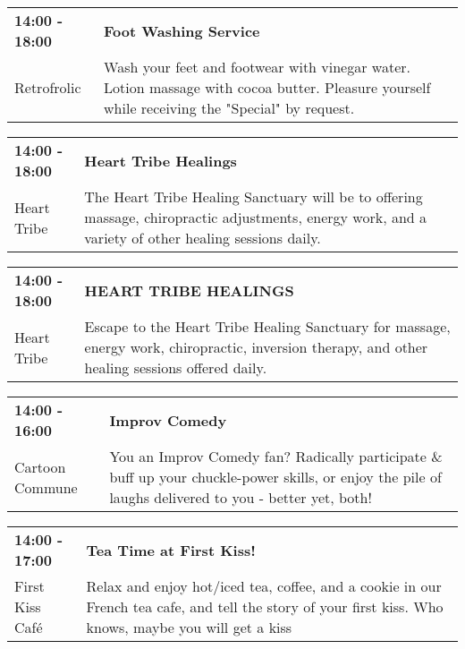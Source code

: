 \begin{tabular}{ p{1in} p{2.2in} }
    \textbf{14:00 - 18:00} & \textbf{Foot Washing Service} \\
    Retrofrolic \newline  & Wash your feet and footwear with vinegar water.  Lotion massage with cocoa butter. Pleasure yourself while receiving the "Special" by request. \\
    \hline 
\end{tabular}
    
\begin{tabular}{ p{1in} p{2.2in} }
    \textbf{14:00 - 18:00} & \textbf{Heart Tribe Healings} \\
    Heart Tribe \newline  & The Heart Tribe Healing Sanctuary will be to offering massage, chiropractic adjustments, energy work, and a variety of other healing sessions daily. \\
    \hline 
\end{tabular}
    
\begin{tabular}{ p{1in} p{2.2in} }
    \textbf{14:00 - 18:00} & \textbf{HEART TRIBE HEALINGS} \\
    Heart Tribe \newline  & Escape to the Heart Tribe Healing Sanctuary for massage, energy work, chiropractic, inversion therapy, and other healing sessions offered daily. \\
    \hline 
\end{tabular}
    
\begin{tabular}{ p{1in} p{2.2in} }
    \textbf{14:00 - 16:00} & \textbf{Improv Comedy} \\
    Cartoon Commune \newline  & You an Improv Comedy fan? Radically participate \& buff up your chuckle-power skills, or enjoy the pile of laughs delivered to you - better yet, both! \\
    \hline 
\end{tabular}
    
\begin{tabular}{ p{1in} p{2.2in} }
    \textbf{14:00 - 17:00} & \textbf{Tea Time at First Kiss!} \\
    First Kiss Caf\'e \newline  & Relax and enjoy hot/iced tea, coffee, and a cookie in our French tea cafe, and tell the story of your first kiss. Who knows, maybe you will get a kiss \\
    \hline 
\end{tabular}
    
